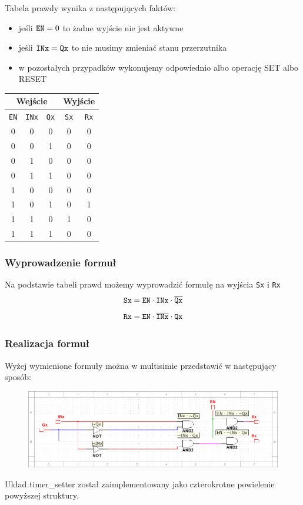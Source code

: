 \documentclass[a4paper]{article}
\begin{document}
Tabela prawdy wynika z następujących faktów:
\begin{itemize}
    \item jeśli $ \verb|EN| = 0 $ to żadne wyjście nie jest aktywne
    \item jeśli $ \verb|INx| = \verb|Qx| $ to nie musimy zmieniać stanu przerzutnika
    \item w pozostałych przypadków wykonujemy odpowiednio albo operację SET albo RESET
\end{itemize}

\begin{center}
    \begin{tabular}{|c|c|c||c|c|}
    \hline \multicolumn{3}{|c||}{Wejście} & \multicolumn{2}{|c|}{Wyjście} \\
    \hline \verb|EN| & \verb|INx| & \verb|Qx| &  \verb|Sx| & \verb|Rx| \\
    \hline 0 & 0 & 0 & 0 & 0 \\
    \hline 0 & 0 & 1 & 0 & 0 \\
    \hline 0 & 1 & 0 & 0 & 0 \\
    \hline 0 & 1 & 1 & 0 & 0 \\
    \hline 1 & 0 & 0 & 0 & 0 \\
    \hline 1 & 0 & 1 & 0 & 1 \\
    \hline 1 & 1 & 0 & 1 & 0 \\
    \hline 1 & 1 & 1 & 0 & 0 \\
    \hline 
    \end{tabular}
\end{center}

\subsubsection{Wyprowadzenie formuł}
Na podstawie tabeli prawd możemy wyprowadzić formułę na wyjścia \verb|Sx| i \verb|Rx|
\[\verb|Sx| = \verb|EN| \cdot \verb|INx| \cdot \overline{\texttt{Qx}}\]
\[\verb|Rx| = \verb|EN| \cdot \overline{\texttt{INx}} \cdot \texttt{Qx}\]

\subsubsection{Realizacja formuł}
Wyżej wymienione formuły można w multisimie przedstawić w następujący sposób:
\begin{figure}[H]
    \centering
    \includegraphics[width=\textwidth]{model1.png}
\end{figure}
Układ timer\_setter został zaimplementowany jako czterokrotne powielenie powyższej struktury.
\end{document}
